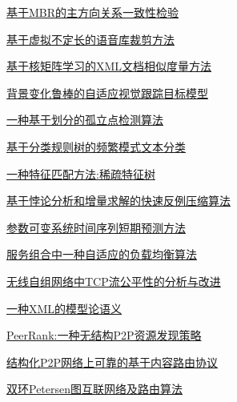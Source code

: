\documentclass[a4paper]{article}
\begin{document}
\href{http://www.jos.org.cn/ch/reader/download_pdf.aspx?file_no=20060504&year_id=2006&quarter_id=5&falg=1}{基于MBR的主方向关系一致性检验}

\href{http://www.jos.org.cn/ch/reader/download_pdf.aspx?file_no=20060505&year_id=2006&quarter_id=5&falg=1}{基于虚拟不定长的语音库裁剪方法}

\href{http://www.jos.org.cn/ch/reader/download_pdf.aspx?file_no=20060506&year_id=2006&quarter_id=5&falg=1}{基于核矩阵学习的XML文档相似度量方法}

\href{http://www.jos.org.cn/ch/reader/download_pdf.aspx?file_no=20060507&year_id=2006&quarter_id=5&falg=1}{背景变化鲁棒的自适应视觉跟踪目标模型}

\href{http://www.jos.org.cn/ch/reader/download_pdf.aspx?file_no=20060508&year_id=2006&quarter_id=5&falg=1}{一种基于划分的孤立点检测算法}

\href{http://www.jos.org.cn/ch/reader/download_pdf.aspx?file_no=20060509&year_id=2006&quarter_id=5&falg=1}{基于分类规则树的频繁模式文本分类}

\href{http://www.jos.org.cn/ch/reader/download_pdf.aspx?file_no=20060510&year_id=2006&quarter_id=5&falg=1}{一种特征匹配方法:稀疏特征树}

\href{http://www.jos.org.cn/ch/reader/download_pdf.aspx?file_no=20060511&year_id=2006&quarter_id=5&falg=1}{基于悖论分析和增量求解的快速反例压缩算法}

\href{http://www.jos.org.cn/ch/reader/download_pdf.aspx?file_no=20060512&year_id=2006&quarter_id=5&falg=1}{参数可变系统时间序列短期预测方法}

\href{http://www.jos.org.cn/ch/reader/download_pdf.aspx?file_no=20060514&year_id=2006&quarter_id=5&falg=1}{服务组合中一种自适应的负载均衡算法}

\href{http://www.jos.org.cn/ch/reader/download_pdf.aspx?file_no=20060515&year_id=2006&quarter_id=5&falg=1}{无线自组网络中TCP流公平性的分析与改进}

\href{http://www.jos.org.cn/ch/reader/download_pdf.aspx?file_no=20060516&year_id=2006&quarter_id=5&falg=1}{一种XML的模型论语义}

\href{http://www.jos.org.cn/ch/reader/download_pdf.aspx?file_no=20060517&year_id=2006&quarter_id=5&falg=1}{PeerRank:一种无结构P2P资源发现策略}

\href{http://www.jos.org.cn/ch/reader/download_pdf.aspx?file_no=20060518&year_id=2006&quarter_id=5&falg=1}{结构化P2P网络上可靠的基于内容路由协议}

\href{http://www.jos.org.cn/ch/reader/download_pdf.aspx?file_no=20060519&year_id=2006&quarter_id=5&falg=1}{双环Petersen图互联网络及路由算法}
\end{document}
